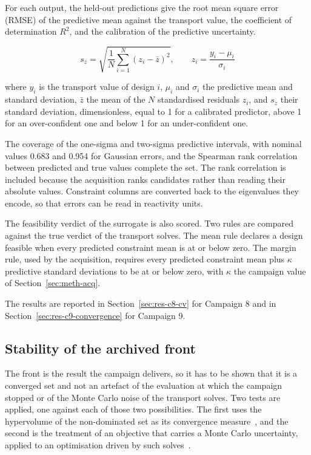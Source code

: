 For each output, the held-out predictions give the root mean square
error (RMSE) of the predictive mean against the transport value, the
coefficient of determination $R^2$, and the calibration of the
predictive uncertainty.

\begin{equation}
  s_z = \sqrt{\frac{1}{N}\sum_{i=1}^{N}\left(z_i - \bar{z}\right)^2},
  \qquad z_i = \frac{y_i - \mu_i}{\sigma_i}
  \label{eq:val-sz}
\end{equation}

\noindent where $y_i$ is the transport value of design $i$, $\mu_i$ and
$\sigma_i$ the predictive mean and standard deviation, $\bar{z}$ the
mean of the $N$ standardised residuals $z_i$, and $s_z$ their standard
deviation, dimensionless, equal to 1 for a calibrated predictor, above 1
for an over-confident one and below 1 for an under-confident one.

The coverage of the one-sigma and two-sigma predictive intervals, with
nominal values 0.683 and 0.954 for Gaussian errors, and the Spearman
rank correlation between predicted and true values complete the set.
The rank correlation is included because the acquisition ranks
candidates rather than reading their absolute values. Constraint columns are converted back to
the eigenvalues they encode, so that errors can be read in reactivity
units.

The feasibility verdict of the surrogate is also scored. Two rules are
compared against the true verdict of the transport solves. The mean rule
declares a design feasible when every predicted constraint mean is at or
below zero. The margin rule, used by the acquisition, requires every
predicted constraint mean plus $\kappa$ predictive standard deviations to
be at or below zero, with $\kappa$ the campaign value of
Section~\ref{sec:meth-acq}.

The results are reported in Section~\ref{sec:res-c8-cv} for Campaign 8
and in Section~\ref{sec:res-c9-convergence} for Campaign 9.

\subsection{Stability of the archived front}
\label{sec:validation-front}

The front is the result the campaign delivers, so it has to be shown
that it is a converged set and not an artefact of the evaluation at
which the campaign stopped or of the Monte Carlo noise of the transport
solves. Two tests are applied, one against each of those two
possibilities. The first uses the hypervolume of the non-dominated set
as its convergence measure~\cite{coello_2007}, and the second is the
treatment of an objective that carries a Monte Carlo uncertainty,
applied to an optimisation driven by such
solves~\cite{erdem_2025_mc_uncertainty}.

